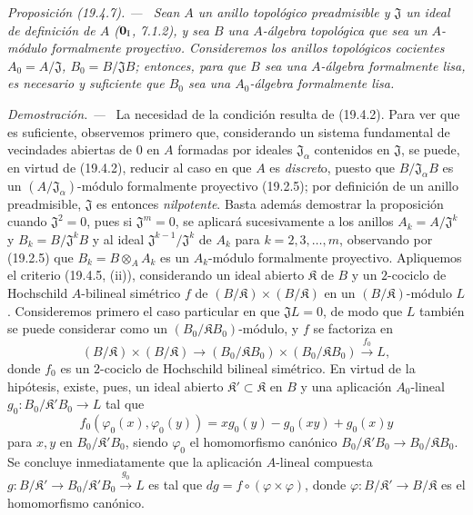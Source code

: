 \documentclass[10pt,oneside]{book}
\makeatletter
\newcommand{\setmanualcurrentlabel}[1]{\def\@currentlabel{#1}}
\newcommand{\oldpage}[2][]{%
  \setcounter{footnote}{0}%
  \marginpar{\scriptsize\textbf{#1}~|~#2}\ignorespaces}
\newenvironment{proposition}[1][]{%
  \setmanualcurrentlabel{#1}\par\medskip\noindent\itshape Proposición (#1). ---\ }{\par}
\newenvironment{proof}{%
  \par\medskip\noindent\textit{Demostración. ---\ }}{\par}
\makeatother
\begin{document}
\begin{proposition}[19.4.7]
\label{0.19.4.7-es}
Sean $A$ un anillo topológico preadmisible y $\mathfrak J$ un ideal de
definición de $A$ \textup{($\mathbf 0_{\rm I}$, 7.1.2)}, y sea $B$ una $A$-álgebra
topológica que sea un $A$-módulo formalmente proyectivo. Consideremos los
anillos topológicos cocientes $A_0=A/\mathfrak J$,
$B_0=B/\mathfrak JB$; entonces, para que $B$ sea una $A$-álgebra formalmente
lisa, es necesario y suficiente que $B_0$ sea una $A_0$-álgebra formalmente
lisa.
\end{proposition}

\oldpage[0\textsubscript{IV-1}]{89}

\begin{proof}
La necesidad de la condición resulta de (19.4.2). Para ver que es
suficiente, observemos primero que, considerando un sistema fundamental de
vecindades abiertas de $0$ en $A$ formadas por ideales
$\mathfrak J_\alpha$ contenidos en $\mathfrak J$, se puede, en virtud de
(19.4.2), reducir al caso en que $A$ es \emph{discret}o, puesto que
$B/\mathfrak J_\alpha B$ es un
$(A/\mathfrak J_\alpha)$-módulo formalmente proyectivo (19.2.5); por
definición de un anillo preadmisible, $\mathfrak J$ es entonces
\emph{nilpotente}. Basta además demostrar la proposición cuando
$\mathfrak J^2=0$, pues si $\mathfrak J^m=0$, se aplicará sucesivamente
a los anillos $A_k=A/\mathfrak J^k$ y $B_k=B/\mathfrak J^kB$ y al ideal
$\mathfrak J^{k-1}/\mathfrak J^k$ de $A_k$ para $k=2,3,\ldots,m$,
observando por (19.2.5) que $B_k=B\otimes_A A_k$ es un $A_k$-módulo formalmente
proyectivo. Apliquemos el criterio (19.4.5, (ii)), considerando un ideal abierto
$\mathfrak K$ de $B$ y un $2$-cociclo de Hochschild $A$-bilineal
simétrico $f$ de $(B/\mathfrak K)\times(B/\mathfrak K)$ en un
$(B/\mathfrak K)$-módulo $L$. Consideremos primero el caso particular en que
$\mathfrak JL=0$, de modo que $L$ también se puede considerar como un
$(B_0/\mathfrak KB_0)$-módulo, y $f$ se factoriza en
\[
  (B/\mathfrak K)\times(B/\mathfrak K)\to
  (B_0/\mathfrak KB_0)\times(B_0/\mathfrak KB_0)
  \xrightarrow{f_0}L,
\]
donde $f_0$ es un $2$-cociclo de Hochschild bilineal simétrico. En virtud de
la hipótesis, existe, pues, un ideal abierto
$\mathfrak K'\subset\mathfrak K$ en $B$ y una aplicación
$A_0$-lineal $g_0:B_0/\mathfrak K'B_0\to L$ tal que
\[
  f_0(\varphi_0(x),\varphi_0(y))
  =xg_0(y)-g_0(xy)+g_0(x)y
\]
para $x,y$ en $B_0/\mathfrak K'B_0$, siendo $\varphi_0$
el homomorfismo canónico
$B_0/\mathfrak K'B_0\to B_0/\mathfrak KB_0$. Se concluye inmediatamente que
la aplicación $A$-lineal compuesta
$g:B/\mathfrak K'\to B_0/\mathfrak K'B_0\xrightarrow{g_0}L$ es tal
que $dg=f\circ(\varphi\times\varphi)$, donde
$\varphi:B/\mathfrak K'\to B/\mathfrak K$ es el homomorfismo
canónico.


\end{proof}
\end{document}
